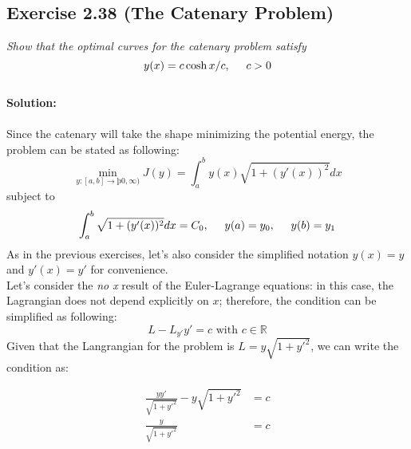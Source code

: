 \subsection{Exercise 2.38 (The Catenary Problem)}
\emph{Show that the optimal curves for the catenary problem satisfy}
\begin{equation}
    y(x) = c \cosh{x/c}, \hspace{0.5cm} c>0
\end{equation}
\\
\textbf{Solution:}\\
\\
Since the catenary will take the shape minimizing the potential energy, the problem can be stated as following:
\begin{equation}
    \min_{y:[a, b] \to þ0, \infty)} J(y) = \int_a^b y(x) \sqrt{1 + (y'(x))^2} dx
\end{equation}
subject to
\begin{equation}
    \int_a^b  \sqrt{1 + (y'(x))^2} dx = C_0, \hspace{0.5 cm} y(a) = y_0 ,\hspace{0.5cm} y(b) = y_1
\end{equation}
As in the previous exercises, let's also consider the simplified notation $y(x) = y$ and $y'(x) = y'$ for convenience.\\
Let's consider the \emph{no x} result of the Euler-Lagrange equations: in this case, the Lagrangian does not depend explicitly on $x$; therefore, the condition can be simplified as following:
\begin{equation}
    L - L_{y'}y' = c \text{ with } {c \in \mathbb{R}}
\end{equation}
Given that the Langrangian for the problem is $L = y\sqrt{1+y'^2}$, we can write the condition as:

\begin{align}
    \frac{y y'}{\sqrt{1+y'^2}} - y\sqrt{1+y'^2} &= c \\
    \frac{y}{\sqrt{1+y'^2}} &= c \\
\end{align}

